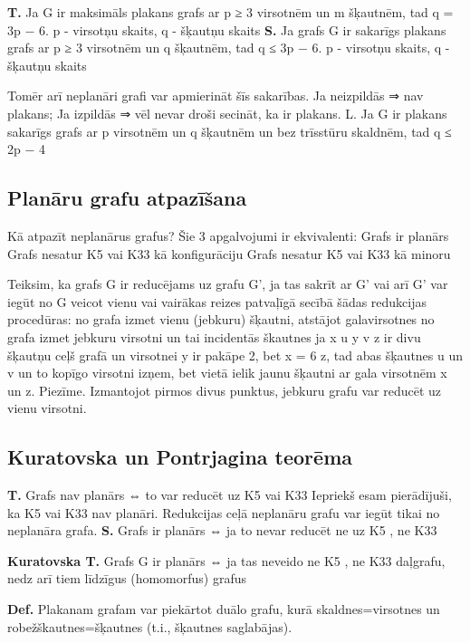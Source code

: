\documentclass{article}
\begin{document}
\textbf{T.}  Ja G ir maksimāls plakans grafs ar p ≥ 3 virsotnēm un m šķautnēm, tad q = 3p − 6.  p - virsotņu skaits, q - šķautņu skaits
\textbf{S. } Ja grafs G ir sakarīgs plakans grafs ar p ≥ 3 virsotnēm un q šķautnēm, tad q ≤ 3p − 6.  p - virsotņu skaits, q - šķautņu skaits

Tomēr arī neplanāri grafi var apmierināt šīs sakarības.  Ja neizpildās ⇒ nav plakans; Ja izpildās ⇒ vēl nevar droši secināt, ka ir plakans. L.  Ja G ir plakans sakarīgs grafs ar p virsotnēm un q šķautnēm un bez trīsstūru skaldnēm, tad q ≤ 2p − 4

\subsection{Planāru grafu atpazīšana}

Kā atpazīt neplanārus grafus?
Šie 3 apgalvojumi ir ekvivalenti:
Grafs ir planārs
Grafs nesatur K5 vai K33 kā konfigurāciju
Grafs nesatur K5 vai K33 kā minoru

Teiksim, ka grafs G ir reducējams uz grafu G', ja tas sakrīt ar G' vai arī G' var iegūt no G veicot vienu vai vairākas reizes patvaļīgā secībā šādas redukcijas procedūras: no grafa izmet vienu (jebkuru) šķautni, atstājot galavirsotnes no grafa izmet jebkuru virsotni un tai incidentās škautnes ja x u y v z ir divu šķautņu ceļš grafā un virsotnei y ir pakāpe 2, bet x = 6 z, tad abas šķautnes u un v un to kopīgo virsotni izņem, bet vietā ielik jaunu šķautni ar gala virsotnēm x un z.  Piezīme. Izmantojot pirmos divus punktus, jebkuru grafu var reducēt uz vienu virsotni.

\subsection{Kuratovska un Pontrjagina teorēma}

\textbf{T.}  Grafs nav planārs ⇔ to var reducēt uz K5 vai K33 Iepriekš esam pierādījuši, ka K5 vai K33 nav planāri.  Redukcijas ceļā neplanāru grafu var iegūt tikai no neplanāra grafa.
\textbf{S. } Grafs ir planārs ⇔ ja to nevar reducēt ne uz K5 , ne K33

\textbf{Kuratovska T.} Grafs G ir planārs ⇔ ja tas neveido ne K5 , ne K33 daļgrafu, nedz arī tiem līdzīgus (homomorfus) grafus

\textbf{Def.}  Plakanam grafam var piekārtot duālo grafu, kurā skaldnes=virsotnes un robežškautnes=šķautnes (t.i., šķautnes saglabājas).
\end{document}
